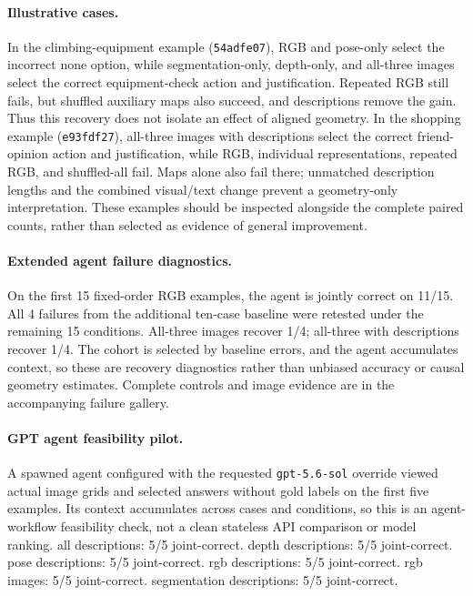 \paragraph{Illustrative cases.} In the climbing-equipment example (\texttt{54adfe07}), RGB and pose-only select the incorrect none option, while segmentation-only, depth-only, and all-three images select the correct equipment-check action and justification. Repeated RGB still fails, but shuffled auxiliary maps also succeed, and descriptions remove the gain. Thus this recovery does not isolate an effect of aligned geometry. In the shopping example (\texttt{e93fdf27}), all-three images with descriptions select the correct friend-opinion action and justification, while RGB, individual representations, repeated RGB, and shuffled-all fail. Maps alone also fail there; unmatched description lengths and the combined visual/text change prevent a geometry-only interpretation. These examples should be inspected alongside the complete paired counts, rather than selected as evidence of general improvement.
\paragraph{Extended agent failure diagnostics.} On the first 15 fixed-order RGB examples, the agent is jointly correct on 11/15. All 4 failures from the additional ten-case baseline were retested under the remaining 15 conditions. All-three images recover 1/4; all-three with descriptions recover 1/4. The cohort is selected by baseline errors, and the agent accumulates context, so these are recovery diagnostics rather than unbiased accuracy or causal geometry estimates. Complete controls and image evidence are in the accompanying failure gallery.
\paragraph{GPT agent feasibility pilot.} A spawned agent configured with the requested \texttt{gpt-5.6-sol} override viewed actual image grids and selected answers without gold labels on the first five examples. Its context accumulates across cases and conditions, so this is an agent-workflow feasibility check, not a clean stateless API comparison or model ranking. all descriptions: 5/5 joint-correct. depth descriptions: 5/5 joint-correct. pose descriptions: 5/5 joint-correct. rgb descriptions: 5/5 joint-correct. rgb images: 5/5 joint-correct. segmentation descriptions: 5/5 joint-correct. 

